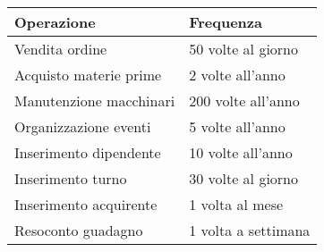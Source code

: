 \begin{center}
	\begin{tabular}{P{9.5cm}P{6cm}}
		\toprule
		 Operazione & Frequenza \\
		\midrule
		Vendita ordine & 50 volte al giorno\\
		\midrule
		Acquisto materie prime & 2 volte all'anno\\
		\midrule
		Manutenzione macchinari & 200 volte all'anno\\
		\midrule
		Organizzazione eventi & 5 volte all'anno\\
		\midrule
		Inserimento dipendente & 10 volte all'anno\\
		\midrule
		Inserimento turno & 30 volte al giorno\\
		\midrule
		Inserimento acquirente & 1 volta al mese\\
		\midrule
		Resoconto guadagno & 1 volta a settimana\\
		\bottomrule
	\end{tabular}
\end{center}